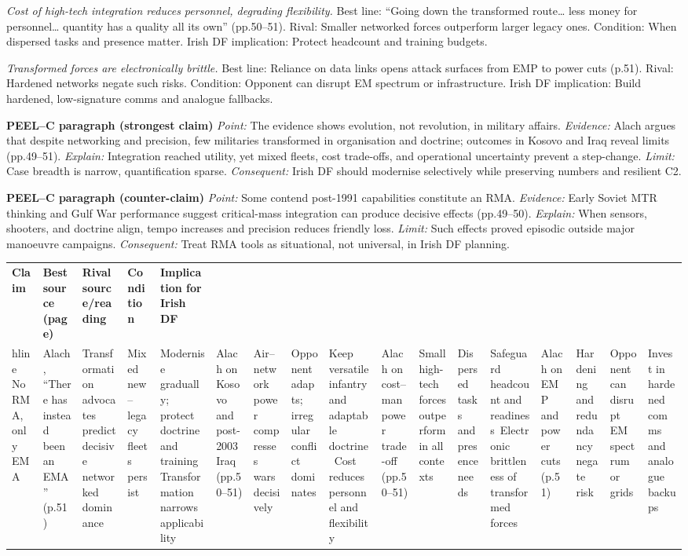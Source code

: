 \textit{Cost of high-tech integration reduces personnel, degrading flexibility.} Best line: “Going down the transformed route… less money for personnel… quantity has a quality all its own” (pp.50–51). Rival: Smaller networked forces outperform larger legacy ones. Condition: When dispersed tasks and presence matter. Irish DF implication: Protect headcount and training budgets.

\textit{Transformed forces are electronically brittle.} Best line: Reliance on data links opens attack surfaces from EMP to power cuts (p.51). Rival: Hardened networks negate such risks. Condition: Opponent can disrupt EM spectrum or infrastructure. Irish DF implication: Build hardened, low-signature comms and analogue fallbacks.

\textbf{PEEL–C paragraph (strongest claim)}
\textit{Point:} The evidence shows evolution, not revolution, in military affairs.
\textit{Evidence:} Alach argues that despite networking and precision, few militaries transformed in organisation and doctrine; outcomes in Kosovo and Iraq reveal limits (pp.49–51).
\textit{Explain:} Integration reached utility, yet mixed fleets, cost trade-offs, and operational uncertainty prevent a step-change.
\textit{Limit:} Case breadth is narrow, quantification sparse.
\textit{Consequent:} Irish DF should modernise selectively while preserving numbers and resilient C2.

\textbf{PEEL–C paragraph (counter-claim)}
\textit{Point:} Some contend post-1991 capabilities constitute an RMA.
\textit{Evidence:} Early Soviet MTR thinking and Gulf War performance suggest critical-mass integration can produce decisive effects (pp.49–50).
\textit{Explain:} When sensors, shooters, and doctrine align, tempo increases and precision reduces friendly loss.
\textit{Limit:} Such effects proved episodic outside major manoeuvre campaigns.
\textit{Consequent:} Treat RMA tools as situational, not universal, in Irish DF planning.

\usepackage{array}
\begin{tabular}{p{3.2cm}p{4.2cm}p{3.6cm}p{3.2cm}p{4.2cm}}
	\textbf{Claim} & \textbf{Best source (page)} & \textbf{Rival source/reading} & \textbf{Condition} & \textbf{Implication for Irish DF}\\hline
	No RMA, only EMA & Alach, “There has instead been an EMA” (p.51) & Transformation advocates predict decisive networked dominance & Mixed new–legacy fleets persist & Modernise gradually; protect doctrine and training\
	Transformation narrows applicability & Alach on Kosovo and post-2003 Iraq (pp.50–51) & Air–network power compresses wars decisively & Opponent adapts; irregular conflict dominates & Keep versatile infantry and adaptable doctrine\
	Cost reduces personnel and flexibility & Alach on cost–manpower trade-off (pp.50–51) & Small high-tech forces outperform in all contexts & Dispersed tasks and presence needs & Safeguard headcount and readiness\
	Electronic brittleness of transformed forces & Alach on EMP and power cuts (p.51) & Hardening and redundancy negate risk & Opponent can disrupt EM spectrum or grids & Invest in hardened comms and analogue backups\
\end{tabular}

